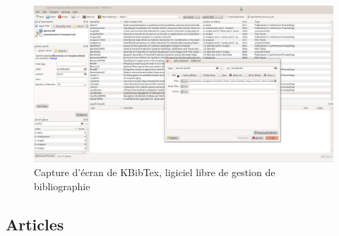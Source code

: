 \documentclass{beamer}
\begin{document}
\begin{frame}
  \begin{figure}
    \includegraphics[width=1.0\linewidth]{images/KBibTex.png}
    \caption{Capture d'écran de KBibTex, ligiciel libre de gestion de bibliographie}
  \end{figure}
\end{frame}

\subsection*{Articles}
\end{document}
